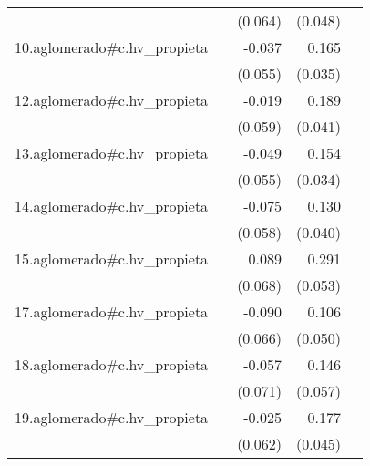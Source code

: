 {\begin{longtable}{l*{4}{D{.}{.}{-1}}}
            &                     &     (0.064)         &     (0.048)         &                     \\
\addlinespace
10.aglomerado#c.hv\_propieta&                     &      -0.037         &       0.165\sym{***}&                     \\
            &                     &     (0.055)         &     (0.035)         &                     \\
\addlinespace
12.aglomerado#c.hv\_propieta&                     &      -0.019         &       0.189\sym{***}&                     \\
            &                     &     (0.059)         &     (0.041)         &                     \\
\addlinespace
13.aglomerado#c.hv\_propieta&                     &      -0.049         &       0.154\sym{***}&                     \\
            &                     &     (0.055)         &     (0.034)         &                     \\
\addlinespace
14.aglomerado#c.hv\_propieta&                     &      -0.075         &       0.130\sym{**} &                     \\
            &                     &     (0.058)         &     (0.040)         &                     \\
\addlinespace
15.aglomerado#c.hv\_propieta&                     &       0.089         &       0.291\sym{***}&                     \\
            &                     &     (0.068)         &     (0.053)         &                     \\
\addlinespace
17.aglomerado#c.hv\_propieta&                     &      -0.090         &       0.106\sym{*}  &                     \\
            &                     &     (0.066)         &     (0.050)         &                     \\
\addlinespace
18.aglomerado#c.hv\_propieta&                     &      -0.057         &       0.146\sym{*}  &                     \\
            &                     &     (0.071)         &     (0.057)         &                     \\
\addlinespace
19.aglomerado#c.hv\_propieta&                     &      -0.025         &       0.177\sym{***}&                     \\
            &                     &     (0.062)         &     (0.045)         &                     \\

\end{longtable}}
